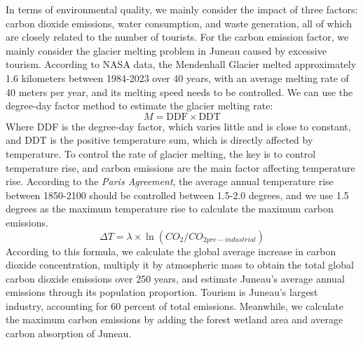 \documentclass[12pt]{article}  %
\begin{document}
In terms of environmental quality, we mainly consider the impact of three factors: carbon dioxide emissions, water consumption, and waste generation, all of which are closely related to the number of tourists.
For the carbon emission factor, we mainly consider the glacier melting problem in Juneau caused by excessive tourism. According to NASA data, the Mendenhall Glacier melted approximately 1.6 kilometers between 1984-2023 over 40 years, with an average melting rate of 40 meters per year, and its melting speed needs to be controlled. We can use the degree-day factor method to estimate the glacier melting rate:
\begin{equation}
    M=\text{DDF}\times \text{DDT}
\end{equation}
Where DDF is the degree-day factor, which varies little and is close to constant, and DDT is the positive temperature sum, which is directly affected by temperature. To control the rate of glacier melting, the key is to control temperature rise, and carbon emissions are the main factor affecting temperature rise. According to the \textit{Paris Agreement}, the average annual temperature rise between 1850-2100 should be controlled between 1.5-2.0 degrees, and we use 1.5 degrees as the maximum temperature rise to calculate the maximum carbon emissions.
\begin{equation}
    \Delta T=\lambda\times \ln(CO_{2}/CO_{2pre-industrial})
\end{equation}
According to this formula, we calculate the global average increase in carbon dioxide concentration, multiply it by atmospheric mass to obtain the total global carbon dioxide emissions over 250 years, and estimate Juneau's average annual emissions through its population proportion. Tourism is Juneau's largest industry, accounting for 60 percent of total emissions. Meanwhile, we calculate the maximum carbon emissions by adding the forest wetland area and average carbon absorption of Juneau.
\end{document}
